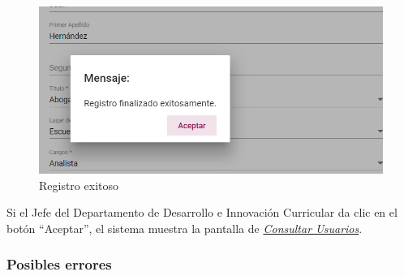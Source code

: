 \begin{figure}[H]
	\centering
	\includegraphics[width=0.4\linewidth]{images/SP5/MSG5}
	\caption{Registro exitoso}
	\label{mensaje5-JDDIC}
	
\end{figure}

Si el Jefe del Departamento de Desarrollo e Innovación Curricular  da clic en el botón “Aceptar”, el sistema muestra la pantalla de  \hyperlink{consultarUs-JDDIC}{\textit{Consultar Usuarios}}.

\subsubsection{Posibles errores}

